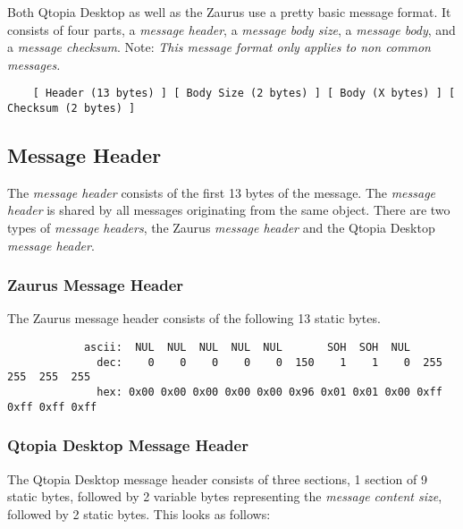     Both Qtopia Desktop as well as the Zaurus use a pretty basic message
    format. It consists of four parts, a \emph{message header}, a
    \emph{message body size}, a \emph{message body},
    and a \emph{message checksum}. Note: \emph{This message format only
    applies to non common messages.}

    \begin{verbatim}
    [ Header (13 bytes) ] [ Body Size (2 bytes) ] [ Body (X bytes) ] [ Checksum (2 bytes) ]
    \end{verbatim}

        \subsection{Message Header}

        The \emph{message header} consists of the first 13 bytes of the
        message. The \emph{message header} is shared by all messages
        originating from the same object. There are two types of
        \emph{message headers}, the Zaurus \emph{message header} and
        the Qtopia Desktop \emph{message header}.

            \subsubsection{Zaurus Message Header}

            The Zaurus message header consists of the following
            13 static bytes.

            \begin{verbatim}
            ascii:  NUL  NUL  NUL  NUL  NUL       SOH  SOH  NUL
              dec:    0    0    0    0    0  150    1    1    0  255  255  255  255
              hex: 0x00 0x00 0x00 0x00 0x00 0x96 0x01 0x01 0x00 0xff 0xff 0xff 0xff
            \end{verbatim}

            \subsubsection{Qtopia Desktop Message Header}

            \label{qtopia:msgheader}
            The Qtopia Desktop message header
            consists of three sections, 1 section of 9 static bytes,
            followed by 2 variable bytes representing the
            \emph{message content size}, followed by 2 static bytes.
            This looks as follows:
            
